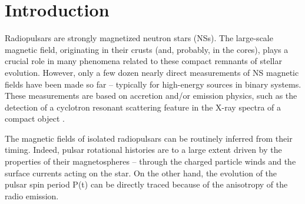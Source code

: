 \documentclass[fleqn,usenatbib]{mnras}
\begin{document}


\section{Introduction}

Radiopulsars are strongly magnetized neutron stars (NSs). The
large-scale magnetic field, originating in their crusts (and, probably,
in the cores), plays a crucial role in many phenomena related to these
compact remnants of stellar evolution. However, only a few dozen
nearly direct measurements of NS magnetic fields have been made
so far -- typically for high-energy sources in binary systems. These
measurements are based on accretion and/or emission physics, such
as the detection of a cyclotron resonant scattering feature in the
X-ray spectra of a compact object \citep[see for instance][and references therein]{anna12, tien13, revmer15, borg15}.

The magnetic fields of isolated radiopulsars can be routinely
inferred from their timing. Indeed, pulsar rotational histories are to
a large extent driven by the properties of their magnetospheres --
through the charged particle winds and the surface currents acting
on the star. On the other hand, the evolution of the pulsar spin period
P(t) can be directly traced because of the anisotropy of the radio
emission.
\end{document}
